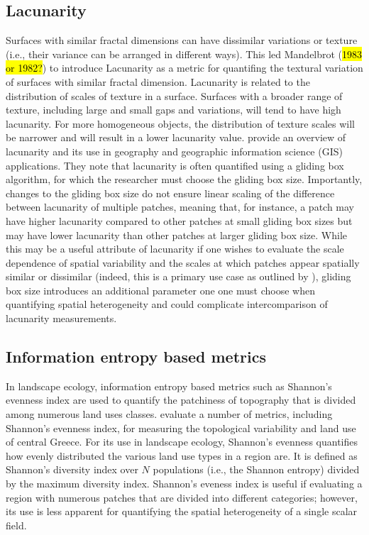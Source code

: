 \subsection{Lacunarity}
Surfaces with similar fractal dimensions can have dissimilar variations or texture (i.e., their variance can be arranged in different ways). This led Mandelbrot (\hl{1983 or 1982?}) to introduce Lacunarity as a metric for quantifing the textural variation of surfaces with similar fractal dimension. Lacunarity is related to the distribution of scales of texture in a surface. Surfaces with a broader range of texture, including large and small gaps and variations, will tend to have high lacunarity. For more homogeneous objects, the distribution of texture scales will be narrower and will result in a lower lacunarity value. \cite{dong_lacunarity_2000} provide an overview of lacunarity and its use in geography and geographic information science (GIS) applications. They note that lacunarity is often quantified using a gliding box algorithm, for which the researcher must choose the gliding box size. Importantly, changes to the gliding box size do not ensure linear scaling of the difference between lacunarity of multiple patches, meaning that, for instance, a patch may have higher lacunarity compared to other patches at small gliding box sizes but may have lower lacunarity than other patches at larger gliding box size. While this may be a useful attribute of lacunarity if one wishes to evaluate the scale dependence of spatial variability and the scales at which patches appear spatially similar or dissimilar (indeed, this is a primary use case as outlined by \cite{dong_lacunarity_2000}), gliding box size introduces an additional parameter one one must choose when quantifying spatial heterogeneity and could complicate intercomparison of lacunarity measurements.

\subsection{Information entropy based metrics}
In landscape ecology, information entropy based metrics such as Shannon’s evenness index are used to quantify the patchiness of topography that is divided among numerous land uses classes. \cite{plexida_selecting_2014} evaluate a number of metrics, including Shannon’s evenness index, for measuring the topological variability and land use of central Greece. For its use in landscape ecology, Shannon’s evenness quantifies how evenly distributed the various land use types in a region are. It is defined as Shannon’s diversity index over $N$ populations (i.e., the Shannon entropy) divided by the maximum diversity index. Shannon's eveness index is useful if evaluating a region with numerous patches that are divided into different categories; however, its use is less apparent for quantifying the spatial heterogeneity of a single scalar field.

